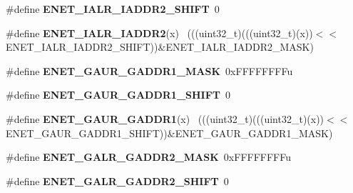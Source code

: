 \begin{DoxyCompactItemize}
\item 
\hypertarget{group___e_n_e_t___register___masks_gadbb5d746c302629f7ed6dab197c0ed89}{}\#define {\bfseries E\+N\+E\+T\+\_\+\+I\+A\+L\+R\+\_\+\+I\+A\+D\+D\+R2\+\_\+\+S\+H\+I\+F\+T}~0\label{group___e_n_e_t___register___masks_gadbb5d746c302629f7ed6dab197c0ed89}

\item 
\hypertarget{group___e_n_e_t___register___masks_gaeb354a82946850e3659a7f33b08d92c0}{}\#define {\bfseries E\+N\+E\+T\+\_\+\+I\+A\+L\+R\+\_\+\+I\+A\+D\+D\+R2}(x)                                        ~(((uint32\+\_\+t)(((uint32\+\_\+t)(x))$<$$<$E\+N\+E\+T\+\_\+\+I\+A\+L\+R\+\_\+\+I\+A\+D\+D\+R2\+\_\+\+S\+H\+I\+F\+T))\&E\+N\+E\+T\+\_\+\+I\+A\+L\+R\+\_\+\+I\+A\+D\+D\+R2\+\_\+\+M\+A\+S\+K)\label{group___e_n_e_t___register___masks_gaeb354a82946850e3659a7f33b08d92c0}

\item 
\hypertarget{group___e_n_e_t___register___masks_ga6ae8043e613c7d0e8962e60b02b9bb04}{}\#define {\bfseries E\+N\+E\+T\+\_\+\+G\+A\+U\+R\+\_\+\+G\+A\+D\+D\+R1\+\_\+\+M\+A\+S\+K}~0x\+F\+F\+F\+F\+F\+F\+F\+Fu\label{group___e_n_e_t___register___masks_ga6ae8043e613c7d0e8962e60b02b9bb04}

\item 
\hypertarget{group___e_n_e_t___register___masks_ga38d4ad90575393e3e79e9436421a71b4}{}\#define {\bfseries E\+N\+E\+T\+\_\+\+G\+A\+U\+R\+\_\+\+G\+A\+D\+D\+R1\+\_\+\+S\+H\+I\+F\+T}~0\label{group___e_n_e_t___register___masks_ga38d4ad90575393e3e79e9436421a71b4}

\item 
\hypertarget{group___e_n_e_t___register___masks_gac012ca535173b0b511377bf56e9f774a}{}\#define {\bfseries E\+N\+E\+T\+\_\+\+G\+A\+U\+R\+\_\+\+G\+A\+D\+D\+R1}(x)                                        ~(((uint32\+\_\+t)(((uint32\+\_\+t)(x))$<$$<$E\+N\+E\+T\+\_\+\+G\+A\+U\+R\+\_\+\+G\+A\+D\+D\+R1\+\_\+\+S\+H\+I\+F\+T))\&E\+N\+E\+T\+\_\+\+G\+A\+U\+R\+\_\+\+G\+A\+D\+D\+R1\+\_\+\+M\+A\+S\+K)\label{group___e_n_e_t___register___masks_gac012ca535173b0b511377bf56e9f774a}

\item 
\hypertarget{group___e_n_e_t___register___masks_ga8e26a6cd7140a83bfb1209d2359f3442}{}\#define {\bfseries E\+N\+E\+T\+\_\+\+G\+A\+L\+R\+\_\+\+G\+A\+D\+D\+R2\+\_\+\+M\+A\+S\+K}~0x\+F\+F\+F\+F\+F\+F\+F\+Fu\label{group___e_n_e_t___register___masks_ga8e26a6cd7140a83bfb1209d2359f3442}

\item 
\hypertarget{group___e_n_e_t___register___masks_ga972b44abee90b40667709db22c6263a1}{}\#define {\bfseries E\+N\+E\+T\+\_\+\+G\+A\+L\+R\+\_\+\+G\+A\+D\+D\+R2\+\_\+\+S\+H\+I\+F\+T}~0\label{group___e_n_e_t___register___masks_ga972b44abee90b40667709db22c6263a1}


\end{DoxyCompactItemize}
